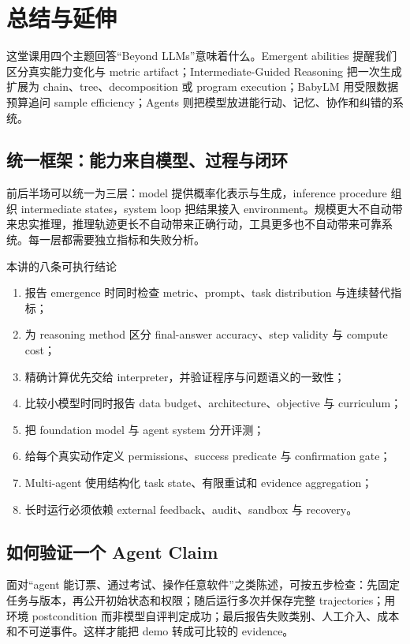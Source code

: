 \section{总结与延伸}

这堂课用四个主题回答“Beyond LLMs”意味着什么。Emergent abilities 提醒我们区分真实能力变化与 metric artifact；Intermediate-Guided Reasoning 把一次生成扩展为 chain、tree、decomposition 或 program execution；BabyLM 用受限数据预算追问 sample efficiency；Agents 则把模型放进能行动、记忆、协作和纠错的系统。

\subsection{统一框架：能力来自模型、过程与闭环}

前后半场可以统一为三层：model 提供概率化表示与生成，inference procedure 组织 intermediate states，system loop 把结果接入 environment。规模更大不自动带来忠实推理，推理轨迹更长不自动带来正确行动，工具更多也不自动带来可靠系统。每一层都需要独立指标和失败分析。

\begin{importantbox}{本讲的八条可执行结论}
\begin{enumerate}
  \item 报告 emergence 时同时检查 metric、prompt、task distribution 与连续替代指标；
  \item 为 reasoning method 区分 final-answer accuracy、step validity 与 compute cost；
  \item 精确计算优先交给 interpreter，并验证程序与问题语义的一致性；
  \item 比较小模型时同时报告 data budget、architecture、objective 与 curriculum；
  \item 把 foundation model 与 agent system 分开评测；
  \item 给每个真实动作定义 permissions、success predicate 与 confirmation gate；
  \item Multi-agent 使用结构化 task state、有限重试和 evidence aggregation；
  \item 长时运行必须依赖 external feedback、audit、sandbox 与 recovery。
\end{enumerate}
\end{importantbox}

\subsection{如何验证一个 Agent Claim}

面对“agent 能订票、通过考试、操作任意软件”之类陈述，可按五步检查：先固定任务与版本，再公开初始状态和权限；随后运行多次并保存完整 trajectories；用环境 postcondition 而非模型自评判定成功；最后报告失败类别、人工介入、成本和不可逆事件。这样才能把 demo 转成可比较的 evidence。

